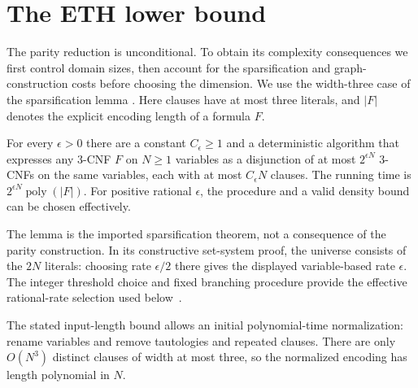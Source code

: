 \section{The ETH lower bound}
\label{sec:complexity}

The parity reduction is unconditional. To obtain its complexity
consequences we first control domain sizes, then account for the
sparsification and graph-construction costs before choosing the dimension.
We use the width-three case of the sparsification lemma
\citep[Corollary~1, p.~523]{IPZ2001}.
Here clauses have at most three literals, and \(|F|\) denotes the explicit
encoding length of a formula \(F\).

\begin{lemma}[Sparsification]
\label{lem:sparsification}
For every \(\epsilon>0\) there are a constant \(C_\epsilon\ge1\) and a
deterministic algorithm that expresses any \(3\)-CNF \(F\) on \(N\ge1\)
variables as a disjunction of at most \(2^{\epsilon N}\) \(3\)-CNFs on
the same variables, each with at most \(C_\epsilon N\) clauses.
The running time is \(2^{\epsilon N}\operatorname{poly}(|F|)\).
For positive rational \(\epsilon\), the procedure and a valid density
bound can be chosen effectively.
\end{lemma}

The lemma is the imported sparsification theorem, not a consequence of
the parity construction. In its constructive set-system proof, the
universe consists of the \(2N\) literals: choosing rate \(\epsilon/2\)
there gives the displayed variable-based rate \(\epsilon\). The integer
threshold choice and fixed branching procedure provide the effective
rational-rate selection used below~\citep[pp.~520--523]{IPZ2001}.

The stated input-length bound allows an initial polynomial-time
normalization: rename variables and remove tautologies and repeated
clauses. There are only \(O(N^3)\) distinct clauses of width at most three,
so the normalized encoding has length polynomial in \(N\).

